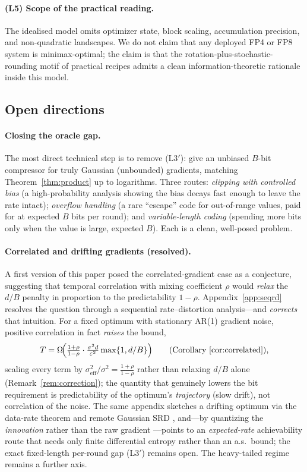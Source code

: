 \documentclass[11pt]{article}
\theoremstyle{definition}
\newcommand{\eps}{\varepsilon}
\begin{document}
\paragraph{(L5) Scope of the practical reading.} The idealised model omits optimizer state, block
scaling, accumulation precision, and non-quadratic landscapes. We do not claim that any deployed
FP4 or FP8 system is minimax-optimal; the claim is that the rotation-plus-stochastic-rounding
motif of practical recipes admits a clean information-theoretic rationale inside this model.

\subsection{Open directions}
\label{sec:discussion:open}

\paragraph{Closing the oracle gap.} The most direct technical step is to remove (L3$'$): give an
unbiased $B$-bit compressor for truly Gaussian (unbounded) gradients, matching
Theorem~\ref{thm:product} up to logarithms. Three routes: \emph{clipping with controlled bias}
(a high-probability analysis showing the bias decays fast enough to leave the rate intact);
\emph{overflow handling} (a rare ``escape'' code for out-of-range values, paid for at expected
$B$ bits per round); and \emph{variable-length coding} (spending more bits only when the value is
large, expected $B$). Each is a clean, well-posed problem.

\paragraph{Correlated and drifting gradients (resolved).} A first version of this paper posed the
correlated-gradient case as a conjecture, suggesting that temporal correlation with mixing coefficient
$\rho$ would \emph{relax} the $d/B$ penalty in proportion to the predictability $1-\rho$.
Appendix~\ref{app:seqrd} resolves the question through a sequential rate--distortion analysis---and
\emph{corrects} that intuition. For a fixed optimum with stationary AR(1) gradient noise, positive
correlation in fact \emph{raises} the bound,
\[
T=\Omega\!\Big(\tfrac{1+\rho}{1-\rho}\cdot\tfrac{\sigma^2 d}{\eps^2}\max\{1,d/B\}\Big)
\qquad(\text{Corollary~\ref{cor:correlated}}),
\]
scaling every term by $\sigma^2_{\mathrm{eff}}/\sigma^2=\tfrac{1+\rho}{1-\rho}$ rather than relaxing
$d/B$ alone (Remark~\ref{rem:correction}); the quantity that genuinely lowers the bit requirement is
predictability of the optimum's \emph{trajectory} (slow drift), not correlation of the noise. The same
appendix sketches a drifting optimum via the data-rate theorem \citep{nair2004stabilizability} and
remote Gaussian SRD \citep{tanaka2017sdp}, and---by quantizing the \emph{innovation} rather than the raw
gradient \citep{kostina2019ratecost}---points to an \emph{expected-rate} achievability route that needs
only finite differential entropy rather than an a.s.\ bound; the exact fixed-length per-round gap
(L3$'$) remains open. The heavy-tailed regime \citep{simsekli2019tail} remains a further axis.
\end{document}
